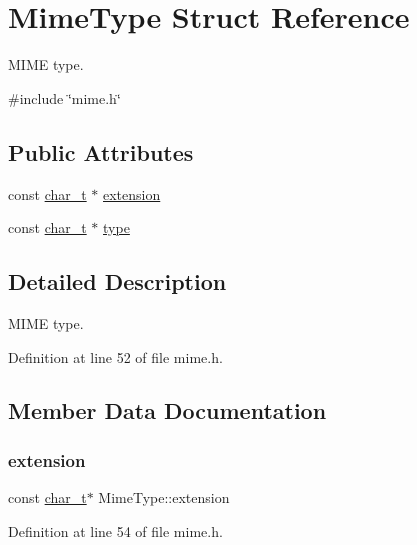 \hypertarget{structMimeType}{}\section{Mime\+Type Struct Reference}
\label{structMimeType}


M\+I\+ME type.  




{\ttfamily \#include \char`\"{}mime.\+h\char`\"{}}

\subsection*{Public Attributes}
\begin{DoxyCompactItemize}
\item 
const \hyperlink{compiler__port_8h_a40bb5262bf908c328fbcfbe5d29d0201}{char\+\_\+t} $\ast$ \hyperlink{structMimeType_a70b2aa2eeadb9806ab77b945a4498f8f}{extension}
\item 
const \hyperlink{compiler__port_8h_a40bb5262bf908c328fbcfbe5d29d0201}{char\+\_\+t} $\ast$ \hyperlink{structMimeType_ac2acbe0a170d917f3d003c768ab6d707}{type}
\end{DoxyCompactItemize}


\subsection{Detailed Description}
M\+I\+ME type. 

Definition at line 52 of file mime.\+h.



\subsection{Member Data Documentation}
\mbox{\label{structMimeType_a70b2aa2eeadb9806ab77b945a4498f8f}} 
\subsubsection{\texorpdfstring{extension}{extension}}
{\footnotesize\ttfamily const \hyperlink{compiler__port_8h_a40bb5262bf908c328fbcfbe5d29d0201}{char\+\_\+t}$\ast$ Mime\+Type\+::extension}



Definition at line 54 of file mime.\+h.

